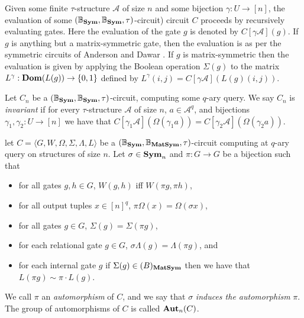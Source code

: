 \documentclass[12pt]{report}
\newcommand{\aut}{\text{\textbf{Aut}}}
\newcommand{\sym}{\text{\textbf{Sym}}}
\newcommand{\dom}{\text{\textbf{Dom}}}
\newcommand{\matsym}{\text{\textbf{MatSym}}}
\begin{document}
Given some finite $\tau$-structure $\mathcal{A}$ of size $n$ and some bijection
$\gamma: U \rightarrow [n]$, the evaluation of some $(\mathbb{B}_\sym,
\mathbb{B}_\sym, \tau)$-circuit) circuit $C$ proceeds by recursively evaluating
gates. Here the evaluation of the gate $g$ is denoted by $C[\gamma
\mathcal{A}](g)$. If $g$ is anything but a matrix-symmetric gate, then the
evaluation is as per the symmetric circuits of Anderson and Dawar \cite{}. If
$g$ is matrix-symmetric then the evaluation is given by applying the Boolean
operation $\Sigma(g)$ to the matrix $L^{\gamma}:\dom(L(g)) \rightarrow \{0,1\}$
defined by $L^{\gamma}(i,j) = C[\gamma \mathcal{A}](L(g)(i,j))$.


\begin{definition}
  Let $C_n$ be a $(\mathbb{B}_\sym, \mathbb{B}_\sym, \tau)$-circuit, computing
  some $q$-ary query. We say $C_n$ is \emph{invariant} if for every
  $\tau$-structure $\mathcal{A}$ of size $n$, $a \in \mathcal{A}^q$, and
  bijections $\gamma_1, \gamma_2: U \rightarrow [n]$ we have that $C[\gamma_1
  \mathcal{A}](\Omega (\gamma_1 a)) = C[\gamma_2 \mathcal{A}](\Omega (\gamma_2
  a))$.
\end{definition}


\begin{definition}[Automorphism]
  let $C = \langle G, W, \Omega, \Sigma, \Lambda, L\rangle$ be a
  $(\mathbb{B}_\sym, \mathbb{B}_\matsym, \tau)$-circuit computing at $q$-ary
  query on structures of size $n$. Let $\sigma \in \sym_n$ and $\pi: G
  \rightarrow G$ be a bijection such that
  \begin{itemize}
    \setlength\itemsep{0mm}
  \item for all gates $g, h \in G$, $W(g,h)$ iff $W(\pi g, \pi h)$,
  \item for all output tuples $x \in [n]^q$, $\pi \Omega (x) = \Omega (\sigma
    x)$,
  \item for all gates $g \in G$, $\Sigma (g) = \Sigma (\pi g)$,
  \item for each relational gate $g \in G$, $\sigma \Lambda (g) = \Lambda (\pi
    g)$, and
  \item for each internal gate $g$ if $\Sigma (g) \in \mathbb(B)_\matsym$ then
    we have that $L(\pi g) \sim \pi \cdot L(g)$.
  \end{itemize}

  We call $\pi$ an \emph{automorphism} of $C$, and we say that $\sigma$
  \emph{induces the automorphism} $\pi$. The group of automorphisms of $C$ is
  called $\aut_n (C)$.
\end{definition}
\end{document}
